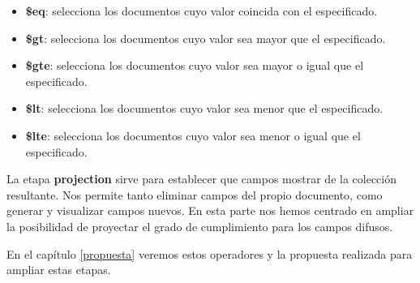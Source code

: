 \begin{itemize}
    \item \textbf{\$eq}: selecciona los documentos cuyo valor coincida con el especificado.
    \item \textbf{\$gt}: selecciona los documentos cuyo valor sea mayor que el especificado.
    \item \textbf{\$gte}: selecciona los documentos cuyo valor sea mayor o igual que el especificado.
    \item \textbf{\$lt}: selecciona los documentos cuyo valor sea menor que el especificado.
    \item \textbf{\$lte}: selecciona los documentos cuyo valor sea menor o igual que el especificado.
\end{itemize}

La etapa \textbf{projection} sirve para establecer que campos mostrar de la colección resultante. Nos permite tanto eliminar campos del propio documento, como generar y visualizar campos nuevos. En esta parte nos hemos centrado en ampliar la posibilidad de proyectar el grado de cumplimiento para los campos difusos.

En el capítulo \ref{propuesta} veremos estos operadores y la propuesta realizada para ampliar estas etapas.
